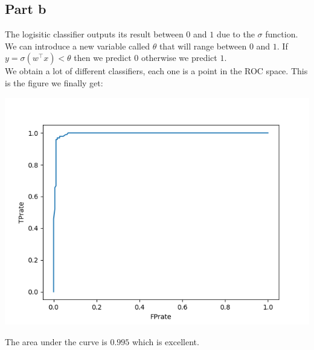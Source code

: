 \documentclass[a4paper, 10pt]{article}
\begin{document}
\subsection{Part b}
The logisitic classifier outputs its result between $0$ and $1$ due to the $\sigma$ function.
We can introduce a new variable called $\theta$ that will range between $0$ and $1$. 
If $y=\sigma(w^\top x) < \theta$ then we predict $0$ otherwise we predict $1$. 
\\
We obtain a lot of different classifiers, each one is a point in the ROC space. This is the figure 
we finally get:
\begin{center}
\includegraphics[scale=0.7]{ex5_roc}
\end{center}
The area under the curve is $0.995$ which is excellent.
\end{document}
